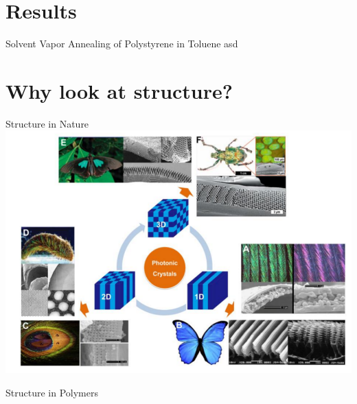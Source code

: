 \documentclass[10pt]{beamer}
\begin{document}
\section{Results}

\begin{frame}{Solvent Vapor Annealing of Polystyrene in Toluene}
asd
\end{frame}

\section{Why look at structure?}

\begin{frame}{Structure in Nature}
\includegraphics[width=\textwidth]{structure.png}
\end{frame}

\begin{frame}{Structure in Polymers}

\end{frame}
\end{document}
